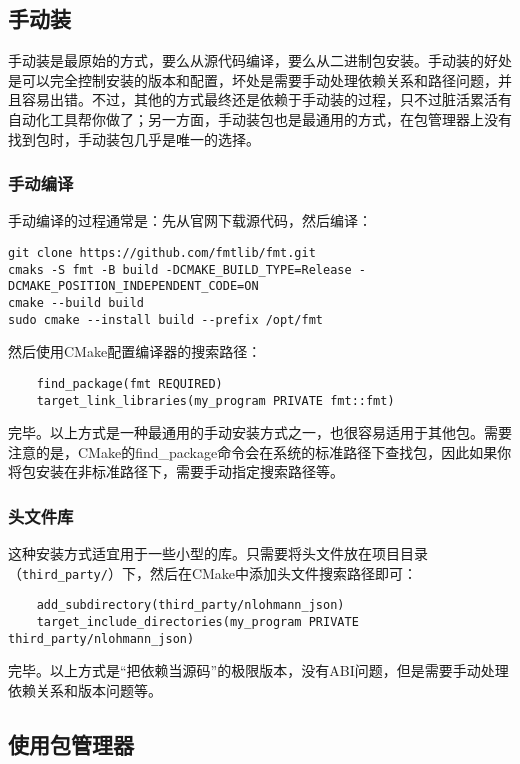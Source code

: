 \subsection{手动装}

手动装是最原始的方式，要么从源代码编译，要么从二进制包安装。手动装的好处是可以完全控制安装的版本和配置，坏处是需要手动处理依赖关系和路径问题，并且容易出错。不过，其他的方式最终还是依赖于手动装的过程，只不过脏活累活有自动化工具帮你做了；另一方面，手动装包也是最通用的方式，在包管理器上没有找到包时，手动装包几乎是唯一的选择。

\subsubsection{手动编译}

手动编译的过程通常是：先从官网下载源代码，然后编译：
\begin{lstlisting}
git clone https://github.com/fmtlib/fmt.git
cmaks -S fmt -B build -DCMAKE_BUILD_TYPE=Release -DCMAKE_POSITION_INDEPENDENT_CODE=ON
cmake --build build
sudo cmake --install build --prefix /opt/fmt
\end{lstlisting}

然后使用CMake配置编译器的搜索路径：
\begin{lstlisting}
    find_package(fmt REQUIRED)
    target_link_libraries(my_program PRIVATE fmt::fmt)
\end{lstlisting}

完毕。以上方式是一种最通用的手动安装方式之一，也很容易适用于其他包。需要注意的是，CMake的find\_package命令会在系统的标准路径下查找包，因此如果你将包安装在非标准路径下，需要手动指定搜索路径等。

\subsubsection{头文件库}

这种安装方式适宜用于一些小型的库。只需要将头文件放在项目目录（\texttt{third\_party/}）下，然后在CMake中添加头文件搜索路径即可：
\begin{lstlisting}
    add_subdirectory(third_party/nlohmann_json)
    target_include_directories(my_program PRIVATE third_party/nlohmann_json)
\end{lstlisting}

完毕。以上方式是“把依赖当源码”的极限版本，没有ABI问题，但是需要手动处理依赖关系和版本问题等。

\subsection{使用包管理器}

